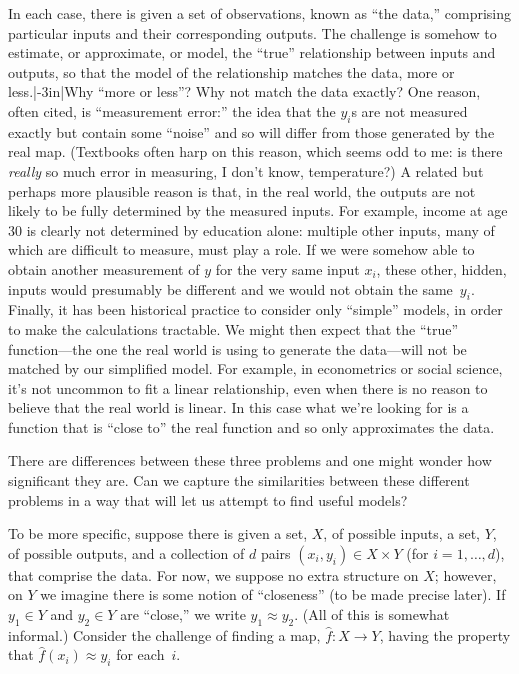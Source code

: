 \documentclass[10pt, a4paper]{article}
\begin{document}
In each case, there is given a set of observations, known as “the
data,” comprising particular inputs and their corresponding
outputs. The challenge is somehow to estimate, or approximate, or
model, the “true” relationship between inputs and outputs, so that the
model of the relationship matches the data, more or
less.\sidenote|-3in|{Why “more or less”? Why not match the data
  exactly? One reason, often cited, is “measurement error:” the idea
  that the $y_i$s are not measured exactly but contain some “noise”
  and so will differ from those generated by the real map. (Textbooks
  often harp on this reason, which seems odd to me: is there
  \emph{really} so much error in measuring, I don't know,
  temperature?)\sidepar%
  A related but perhaps more plausible reason is that, in the real
  world, the outputs are not likely to be fully determined by the
  measured inputs. For example, income at age 30 is clearly not
  determined by education alone: multiple other inputs, many of which
  are difficult to measure, must play a role. If we were somehow able
  to obtain another measurement of $y$ for the very same input $x_i$,
  these other, hidden, inputs would presumably be different and we
  would not obtain the same~$y_i$.\sidepar%
  Finally, it has been historical practice to consider only “simple”
  models, in order to make the calculations tractable. We might then
  expect that the “true” function---the one the real world is using to
  generate the data---will not be matched by our simplified model. For
  example, in econometrics or social science, it's not uncommon to fit
  a linear relationship, even when there is no reason to believe that
  the real world is linear. In this case what we're looking for is a
  function that is “close to” the real function and so only
  approximates the data.}

There are differences between these three problems and one might
wonder how significant they are. Can we capture the similarities
between these different problems in a way that will let us attempt to
find useful models?

To be more specific, suppose there is given a set, $X$, of possible
inputs, a set, $Y$, of possible outputs, and a collection of $d$ pairs
$(x_i, y_i)\in X\times Y$ (for $i=1,\dots,d$), that comprise the data. For
now, we suppose no extra structure on $X$; however, on $Y$ we imagine
there is some notion of “closeness” (to be made precise later). If
$y_1\in Y$ and $y_2\in Y$ are “close,” we write $y_1 \approx y_2$. (All of this
is somewhat informal.) Consider the challenge of finding a map,
$\hat{f}\colon X\to Y$, having the property that
$\hat{f}(x_i) \approx y_i$ for each~$i$.
\end{document}
